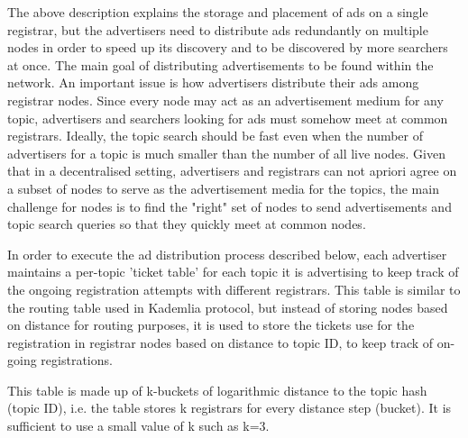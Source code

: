 The above description explains the storage and placement of ads on a single registrar, but the advertisers need to distribute ads redundantly on multiple nodes in order to speed up its discovery and to be discovered by more searchers at once. 
The main goal of distributing advertisements to be found within the network. An important issue is how advertisers distribute their ads among registrar nodes. 
Since every node may act as an advertisement medium for any topic,  advertisers and searchers looking for ads must somehow meet at common registrars. 
Ideally, the topic search should be fast even when the number of advertisers for a topic is much smaller than the number of all live nodes. Given that in a decentralised setting, advertisers and registrars can not apriori agree on a subset of nodes to serve as the advertisement media for the topics, the main challenge for nodes is to find the "right" set of nodes to send advertisements and topic search queries so that they quickly meet at common nodes.

In order to execute the ad distribution process described below,  each advertiser maintains a per-topic 'ticket table' for each topic it is advertising to keep track of the ongoing registration attempts with different registrars. 
This table is similar to the routing table used in Kademlia protocol, 
but instead of storing nodes based on distance for routing purposes, 
it is used to store the tickets use for the registration in registrar nodes based 
on distance to topic ID, to keep track of on-going registrations.

This table is made up of k-buckets of logarithmic distance to the topic hash (topic ID), i.e. the table stores k registrars for every distance step (bucket). It is sufficient to use a small value of k such as k=3. 

